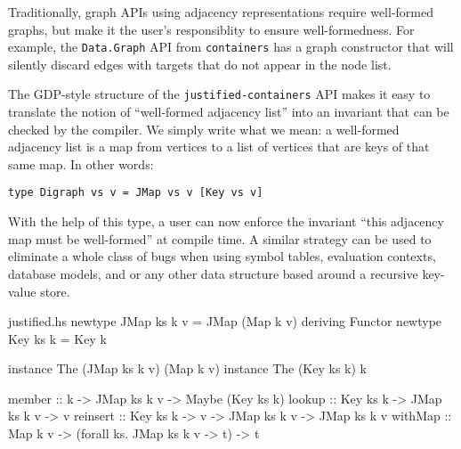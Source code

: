 \documentclass[format=sigplan, review=false, screen=true]{acmart}
\begin{document}
Traditionally, graph APIs using adjacency representations require well-formed
graphs, but make it the user's responsiblity to ensure well-formedness. For example,
the \texttt{Data.Graph} API from \texttt{containers} has a graph constructor that
will silently discard edges with targets that do not appear in the node list.

The GDP-style structure of the \texttt{justified-containers} API makes it easy to
translate the notion of ``well-formed adjacency list'' into an invariant that can
be checked by the compiler. We simply write what we mean: a well-formed adjacency
list is a map from vertices to a list of vertices that are keys of that same map.
In other words:
\begin{verbatim}
type Digraph vs v = JMap vs v [Key vs v]
\end{verbatim}
With the help of this type, a user can now enforce the invariant ``this adjacency map
must be well-formed'' at compile time. A similar strategy can be used to eliminate a
whole class of bugs when using symbol tables, evaluation contexts,
database models, and or any other data structure based around a recursive key-value store.

\begin{filecontents*}{justified.hs}
newtype JMap ks k v = JMap (Map k v) deriving Functor
newtype Key  ks k   = Key k

instance The (JMap ks k v) (Map k v)
instance The (Key ks k) k

member   :: k -> JMap ks k v -> Maybe (Key ks k)
lookup   :: Key ks k -> JMap ks k v -> v
reinsert :: Key ks k -> v -> JMap ks k v -> JMap ks k v
withMap  :: Map k v -> (forall ks. JMap ks k v -> t) -> t
\end{filecontents*}

\end{document}
